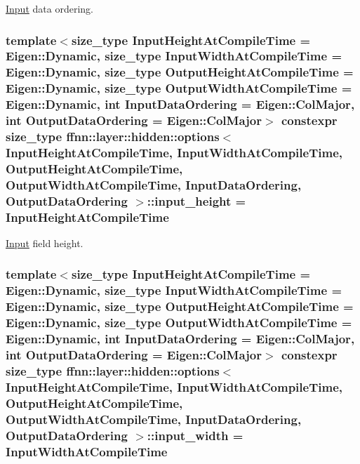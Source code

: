 \hyperlink{classffnn_1_1layer_1_1_input}{Input} data ordering. 

\hypertarget{structffnn_1_1layer_1_1hidden_1_1options_ac51716b775a79ff9f7855a146e8bf0c3}{
\subsubsection[{input\-\_\-height}]{\setlength{\rightskip}{0pt plus 5cm}template$<$size\-\_\-type Input\-Height\-At\-Compile\-Time = Eigen\-::\-Dynamic, size\-\_\-type Input\-Width\-At\-Compile\-Time = Eigen\-::\-Dynamic, size\-\_\-type Output\-Height\-At\-Compile\-Time = Eigen\-::\-Dynamic, size\-\_\-type Output\-Width\-At\-Compile\-Time = Eigen\-::\-Dynamic, int Input\-Data\-Ordering = Eigen\-::\-Col\-Major, int Output\-Data\-Ordering = Eigen\-::\-Col\-Major$>$ constexpr {\bf size\-\_\-type} {\bf ffnn\-::layer\-::hidden\-::options}$<$ Input\-Height\-At\-Compile\-Time, Input\-Width\-At\-Compile\-Time, Output\-Height\-At\-Compile\-Time, Output\-Width\-At\-Compile\-Time, Input\-Data\-Ordering, Output\-Data\-Ordering $>$\-::input\-\_\-height = Input\-Height\-At\-Compile\-Time\hspace{0.3cm}{\ttfamily [static]}}}\label{structffnn_1_1layer_1_1hidden_1_1options_ac51716b775a79ff9f7855a146e8bf0c3}


\hyperlink{classffnn_1_1layer_1_1_input}{Input} field height. 

\hypertarget{structffnn_1_1layer_1_1hidden_1_1options_a4567b834d82f7f709d014809b34ec8c4}{
\subsubsection[{input\-\_\-width}]{\setlength{\rightskip}{0pt plus 5cm}template$<$size\-\_\-type Input\-Height\-At\-Compile\-Time = Eigen\-::\-Dynamic, size\-\_\-type Input\-Width\-At\-Compile\-Time = Eigen\-::\-Dynamic, size\-\_\-type Output\-Height\-At\-Compile\-Time = Eigen\-::\-Dynamic, size\-\_\-type Output\-Width\-At\-Compile\-Time = Eigen\-::\-Dynamic, int Input\-Data\-Ordering = Eigen\-::\-Col\-Major, int Output\-Data\-Ordering = Eigen\-::\-Col\-Major$>$ constexpr {\bf size\-\_\-type} {\bf ffnn\-::layer\-::hidden\-::options}$<$ Input\-Height\-At\-Compile\-Time, Input\-Width\-At\-Compile\-Time, Output\-Height\-At\-Compile\-Time, Output\-Width\-At\-Compile\-Time, Input\-Data\-Ordering, Output\-Data\-Ordering $>$\-::input\-\_\-width = Input\-Width\-At\-Compile\-Time\hspace{0.3cm}{\ttfamily [static]}}}\label{structffnn_1_1layer_1_1hidden_1_1options_a4567b834d82f7f709d014809b34ec8c4}


